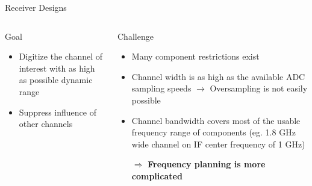 \documentclass[10pt]{beamer}
\newcommand*{\ClipSep}{0.3cm}%
\begin{document}
\begin{frame}{Receiver Designs}
  \begin{columns}[T]
    \begin{column}{.5\textwidth}
      \begin{block}{Goal}
        \begin{itemize}
        \item Digitize the channel of interest with as high as possible
          dynamic range
        \item Suppress influence of other channels
        \end{itemize}
      \end{block}
    \end{column}
    \begin{column}{.5\textwidth}
      \begin{block}{Challenge}
        \begin{itemize}
        \item Many component restrictions exist
        \item Channel width is as high as the available ADC sampling
          speeds $\rightarrow$ Oversampling is not easily possible
        \item Channel bandwidth covers most of the usable frequency
          range of components
          (eg. 1.8 GHz wide channel on IF center frequency of 1 GHz)
        \item[$\Rightarrow$] {\bf Frequency planning is more complicated}
        \end{itemize}
      \end{block}
    \end{column}
  \end{columns}
\end{frame}
\end{document}
